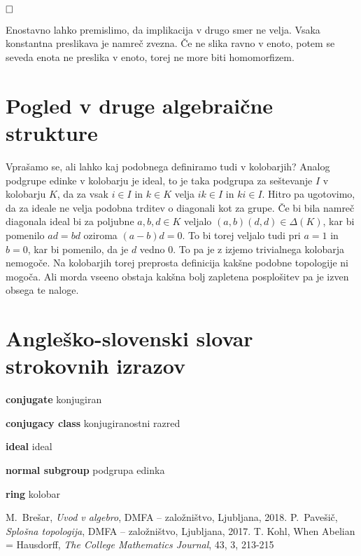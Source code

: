 \documentclass[a4paper,12pt]{article}
\newcommand{\geslo}[2]{\noindent\textbf{#1} {#2}}
\def\qed{$\hfill\Box$}   %
\begin{document}
\qed

Enostavno lahko premislimo, da implikacija v drugo smer ne velja. Vsaka konstantna preslikava je namreč zvezna. Če ne slika ravno v enoto, potem se seveda enota ne preslika v enoto,
torej ne more biti homomorfizem.

\section{Pogled v druge algebraične strukture}

Vprašamo se, ali lahko kaj podobnega definiramo tudi v kolobarjih? Analog podgrupe edinke v kolobarju je ideal, to je taka podgrupa za seštevanje $I$ v kolobarju $K$,
da za vsak $i \in I$ in $k \in K$ velja $ik \in I$ in $ki \in I$. Hitro pa ugotovimo, da za ideale ne velja podobna trditev o diagonali kot za grupe. Če bi bila namreč diagonala
ideal bi za poljubne $a,b,d \in K$ veljalo $(a,b)(d,d) \in \Delta(K)$, kar bi pomenilo $ad = bd$ oziroma $(a-b)d = 0$. To bi torej veljalo tudi pri $a = 1$ in $b = 0$,
kar bi pomenilo, da je $d$ vedno $0$. To pa je z izjemo trivialnega kolobarja nemogoče.
Na kolobarjih torej preprosta definicija kakšne podobne topologije ni mogoča. Ali morda vseeno obstaja kakšna bolj zapletena posplošitev pa je izven obsega te naloge.


\section*{Angleško-slovenski slovar strokovnih izrazov}

\geslo{conjugate}{konjugiran}

\geslo{conjugacy class}{konjugiranostni razred}

\geslo{ideal}{ideal}

\geslo{normal subgroup}{podgrupa edinka}

\geslo{ring}{kolobar}


\begin{thebibliography}{1}
    M.~Brešar, \emph{Uvod v algebro}, DMFA -- založništvo, Ljubljana, 2018.
    P.~Pavešič, \emph{Splošna topologija}, DMFA -- založništvo, Ljubljana, 2017.
    T. Kohl, When Abelian = Hausdorff, \emph{The College Mathematics Journal}, 43, 3, 213-215
\end{thebibliography}
    
\end{document}
